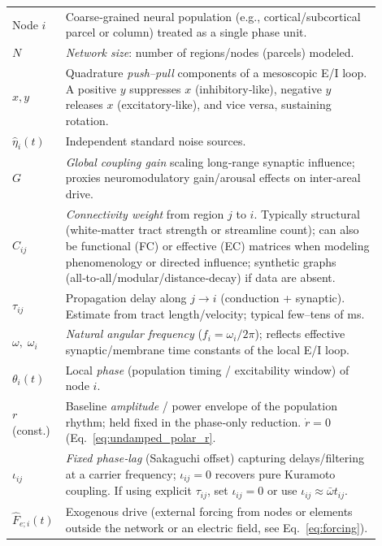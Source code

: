\documentclass[12pt]{article}
\numberwithin{equation}{section}
\begin{document}
\begin{tcolorbox}[
  colback=gray!5,
  colframe=slate,
  colbacktitle=softblue!25,
  coltitle=softblue!60!black,
  fonttitle=\bfseries\small,
 title={\small  \textit{Coupled Undamped Harmonic Oscillators (Eq.~\ref{eq:kuramoto_connectome})}\\ Whole-brain Simulations Parameters \& Physiological Meaning },
  boxrule=0.4pt,
  enhanced, sharp corners,
  left=4pt,right=4pt,top=3pt,bottom=3pt,
  boxsep=2pt,
  before skip=6pt, after skip=6pt
]
\scriptsize
\begin{tabular}{@{}l p{0.9\linewidth}@{}}
Node $i$ & Coarse‑grained neural population (e.g., cortical/subcortical parcel or column) treated as a single phase unit.\\
\textbf{$N$} & \emph{Network size}: number of regions/nodes (parcels) modeled.\\
\textbf{$x,y$} & Quadrature \emph{push–pull} components of a mesoscopic E/I loop. A positive $y$ suppresses $x$ (inhibitory‑like), negative $y$ releases $x$ (excitatory‑like), and vice versa, sustaining rotation.\\
\textbf{$\hat\eta_i(t)$} & Independent standard noise sources.\\
\textbf{$G$} & \emph{Global coupling gain} scaling long‑range synaptic influence; proxies neuromodulatory gain/arousal effects on inter‑areal drive.\\
\textbf{$C_{ij}$} & \emph{Connectivity weight} from region $j$ to $i$. Typically structural (white‑matter tract strength or streamline count); can also be functional (FC) or effective (EC) matrices when modeling phenomenology or directed influence; synthetic graphs (all‑to‑all/modular/distance‑decay) if data are absent.\\
\textbf{$\tau_{ij}$} & Propagation delay along $j\!\to i$ (conduction + synaptic). Estimate from tract length/velocity; typical few–tens of ms.\\
\textbf{$\omega,\;\omega_i$} & \emph{Natural angular frequency} ($f_i=\omega_i/2\pi$); reflects effective synaptic/membrane time constants of the local E/I loop.\\
\textbf{$\theta_i(t)$} & Local \emph{phase} (population timing / excitability window) of node $i$.\\
\textbf{$r$}(const.) & Baseline \emph{amplitude} / power envelope of the population rhythm; held fixed in the phase‑only reduction. $\dot r=0$ (Eq.~\ref{eq:undamped_polar_r}.\\
\textbf{$\iota_{ij}$} & \emph{Fixed phase‑lag} (Sakaguchi offset) capturing delays/filtering at a carrier frequency; $\iota_{ij}=0$ recovers pure Kuramoto coupling. If using explicit $\tau_{ij}$, set $\iota_{ij}{=}0$ or use $\iota_{ij}\approx\bar\omega t_{ij}$.\\
\textbf{$\hat F_{e;i}(t)$}& Exogenous drive  (external forcing from nodes or elements outside the network or an electric field, see Eq.~\ref{eq:forcing}). 


\end{tabular}
\end{tcolorbox}
\end{document}
